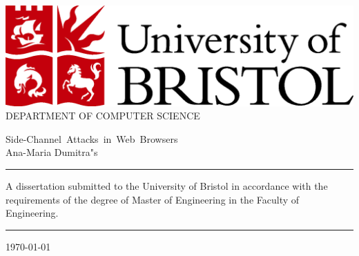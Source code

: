 \documentclass[10pt,a4paper,twoside]{book}
\begin{document}

 \newpage
  \thispagestyle{empty}


  \vspace*{\fill}
  \begin{center}
                \includegraphics[scale=0.3]{logo/logo_uob_color}                \\
                              \vspace*{1.0cm}
                          DEPARTMENT OF COMPUTER SCIENCE                        \\
                              \vspace*{2.0cm}
                       
 				 \mbox{{\LARGE Side-Channel Attacks in Web Browsers}} \\
                              \vspace*{0.5cm}
                              \vspace*{1.0cm}
                          {\Large Ana-Maria Dumitra"s}                         \\

                              \vspace*{1.0cm}
                          \rule{0.5\textwidth}{0.5pt}
                              \vspace*{1.0cm}

            A dissertation submitted to the University of Bristol
            in accordance with the requirements of the degree of
            Master   of Engineering
                    in the Faculty of Engineering.                                

                              \vspace*{1.0cm}
                          \rule{0.5\textwidth}{0.5pt}
                              \vspace*{1.0cm}

                                  \today
  \end{center}
  \vspace*{\fill}
  
\end{document}
